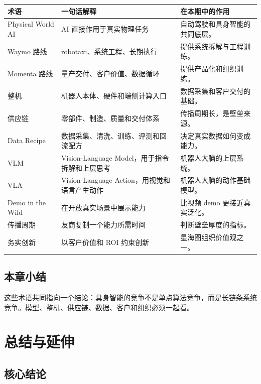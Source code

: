 \documentclass[a4paper]{article}
\begin{document}
\begin{longtable}{p{}p{}p{}}
\toprule
术语 & 一句话解释 & 在本期中的作用 \\
\midrule
Physical World AI & AI 直接作用于真实物理任务 & 自动驾驶和具身智能的共同底层。 \\
Waymo 路线 & robotaxi、系统工程、长期执行 & 提供系统拆解与工程训练。 \\
Momenta 路线 & 量产交付、客户价值、数据循环 & 提供产品化和组织训练。 \\
整机 & 机器人本体、硬件和端侧计算入口 & 数据采集和客户交付的基础。 \\
供应链 & 零部件、制造、质量和交付体系 & 传播周期长，是壁垒来源。 \\
Data Recipe & 数据采集、清洗、训练、评测和回流配方 & 决定真实数据如何变成能力。 \\
VLM & Vision-Language Model，用于指令拆解和上层思考 & 机器人大脑的上层系统。 \\
VLA & Vision-Language-Action，用视觉和语言产生动作 & 机器人大脑的动作基础模型。 \\
Demo in the Wild & 在开放真实场景中展示能力 & 比视频 demo 更接近真实泛化。 \\
传播周期 & 友商复制一个能力所需时间 & 判断壁垒厚度的指标。 \\
务实创新 & 以客户价值和 ROI 约束创新 & 星海图组织价值观之一。 \\
\bottomrule
\end{longtable}

\subsection{本章小结}

这些术语共同指向一个结论：具身智能的竞争不是单点算法竞争，而是长链条系统竞争。模型、整机、供应链、数据、客户和组织必须一起看。

\section{总结与延伸}

\subsection{核心结论}
\end{document}
